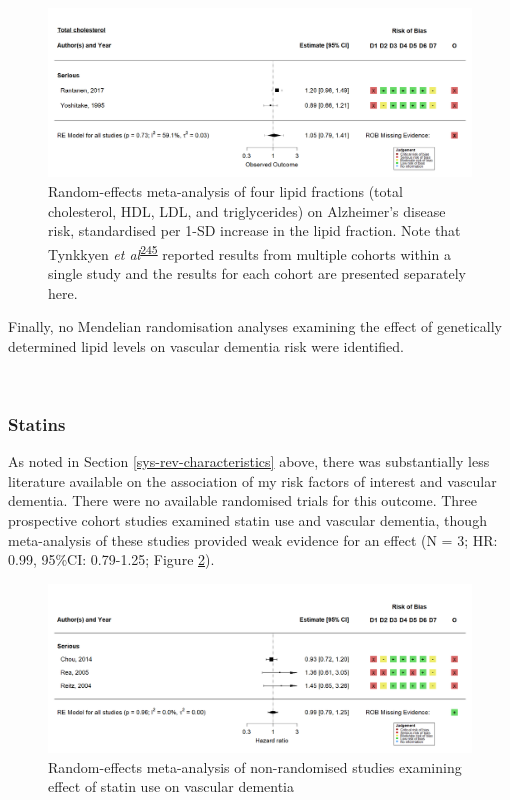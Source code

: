 \documentclass[a4paper, twoside]{templates/ociamthesis}
\begin{document}
\begin{figure}[H]
\includegraphics[width=1\linewidth]{figures/sys-rev/fp_obs_VaD_TC_} \caption[Random-effects meta-analysis of four lipid fractions on Alzheimer's disease]{Random-effects meta-analysis of four lipid fractions (total cholesterol, HDL, LDL, and triglycerides) on Alzheimer's disease risk, standardised per 1-SD increase in the lipid fraction. Note that Tynkkyen \emph{et al}\textsuperscript{\protect\hyperlink{ref-tynkkynen2018}{245}} reported results from multiple cohorts within a single study and the results for each cohort are presented separately here.}\label{fig:lipidFractionsVaD}
\end{figure}

Finally, no Mendelian randomisation analyses examining the effect of genetically determined lipid levels on vascular dementia risk were identified.

~

\hypertarget{statins-2}{%
\subsubsection{Statins}\label{statins-2}}

As noted in Section \ref{sys-rev-characteristics} above, there was substantially less literature available on the association of my risk factors of interest and vascular dementia. There were no available randomised trials for this outcome. Three prospective cohort studies examined statin use and vascular dementia, though meta-analysis of these studies provided weak evidence for an effect (N = 3; HR: 0.99, 95\%CI: 0.79-1.25; Figure \ref{fig:obsStatinVaDFig}).





\begin{figure}[H]
\includegraphics[width=1\linewidth]{figures/sys-rev/fp_obs_Statin-Ever_VaD} \caption[(ref:obsStatinDVaD-scap)]{Random-effects meta-analysis of non-randomised studies examining effect of statin use on vascular dementia}\label{fig:obsStatinVaDFig}
\end{figure}
\end{document}
